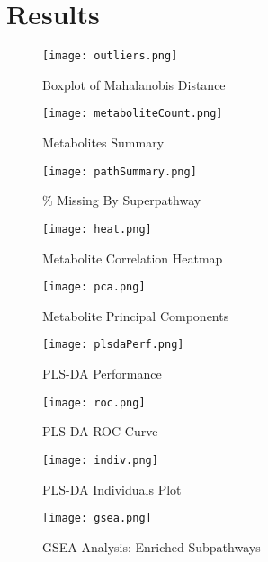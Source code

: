 \documentclass{article}
\begin{document}
\section*{Results}



\begin{figure}
  \caption{Boxplot of Mahalanobis Distance}
  \texttt{[image: outliers.png]}
  \centering
  \label{fig:mahDist}
  \end{figure}

\begin{figure}
  \caption{Metabolites Summary}
  \texttt{[image: metaboliteCount.png]}
  \centering
  \label{fig:metabSum}
  \end{figure}

\begin{figure}
  \caption{\% Missing By Superpathway}
  \texttt{[image: pathSummary.png]}
  \centering
  \label{fig:pathMiss}
  \end{figure}

\begin{figure}
  \caption{Metabolite Correlation Heatmap}
  \texttt{[image: heat.png]}
  \centering
  \label{fig:heat}
  \end{figure}

\begin{figure}
  \caption{Metabolite Principal Components}
  \texttt{[image: pca.png]}
  \centering
  \label{fig:pca}
  \end{figure}

\begin{figure}
  \caption{PLS-DA Performance}
  \texttt{[image: plsdaPerf.png]}
  \centering
  \label{fig:perf}
  \end{figure}


\begin{figure}
  \caption{PLS-DA ROC Curve}
  \texttt{[image: roc.png]}
  \centering
  \label{fig:roc}
  \end{figure}



\begin{figure}
  \caption{PLS-DA Individuals Plot}
  \texttt{[image: indiv.png]}
  \centering
  \label{fig:indiv}
  \end{figure}

\begin{figure}
  \caption{GSEA Analysis: Enriched Subpathways}
  \texttt{[image: gsea.png]}
  \centering
  \label{fig:gsea}
  \end{figure}
\end{document}
